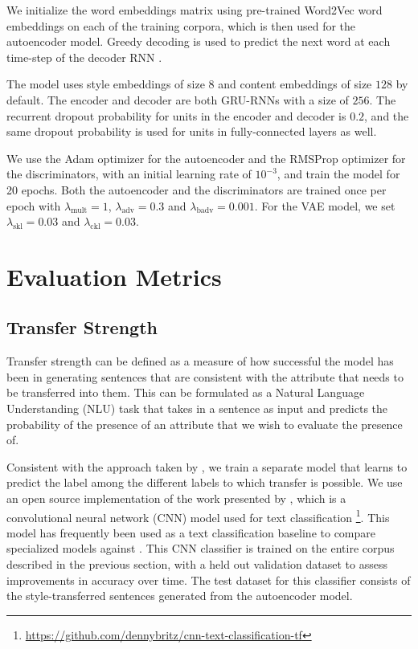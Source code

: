We initialize the word embeddings matrix using pre-trained Word2Vec word embeddings \citep{mikolov2013efficient,mikolov2013distributed,mikolov2013linguistic} on each of the training corpora, which is then used for the autoencoder model. Greedy decoding  is used to predict the next word at each time-step of the decoder RNN \citep{germann2003greedy}.

The model uses style embeddings of size $8$ and content embeddings of size $128$ by default. The encoder and decoder are both GRU-RNNs with a size of $256$. The recurrent dropout probability for units in the encoder and decoder is $0.2$, and the same dropout probability is used for units in fully-connected layers as well.

We use the Adam optimizer \citep{kingma2014adam} for the autoencoder and the RMSProp optimizer \citep{tieleman2012lecture} for the discriminators, with an initial learning rate of $10^{-3}$, and train the model for 20 epochs. Both the autoencoder and the discriminators are trained once per epoch with $\lambda_\text{mult} = 1$, $\lambda_\text{adv} = 0.3$ and $\lambda_\text{badv} = 0.001$. For the VAE model, we set $\lambda_{\text{skl}} = 0.03$ and $\lambda_{\text{ckl}} = 0.03$.


\section{Evaluation Metrics} \label{sec:evaluation-metrics}

\subsection{Transfer Strength}

Transfer strength can be defined as a measure of how successful the model has been in generating sentences that are consistent with the attribute that needs to be transferred into them. This can be formulated as a Natural Language Understanding (NLU) task that takes in a sentence as input and predicts the probability of the presence of an attribute that we wish to evaluate the presence of.

Consistent with the approach taken by \cite{hu2017toward,shen2017style,fu2017style}, we train a separate model that learns to predict the label among the different labels to which transfer is possible. We use an open source implementation of the work presented by \cite{kim2014convolutional}, which is a convolutional neural network (CNN) model used for text classification \footnote{\url{https://github.com/dennybritz/cnn-text-classification-tf}}. This model has frequently been used as a text classification baseline to compare specialized models against \citep{tai2015improved,kiros2015skip,zhang2015character}. This CNN classifier is trained on the entire corpus described in the previous section, with a held out validation dataset to assess improvements in accuracy over time. The test dataset for this classifier consists of the style-transferred sentences generated from the autoencoder model.

